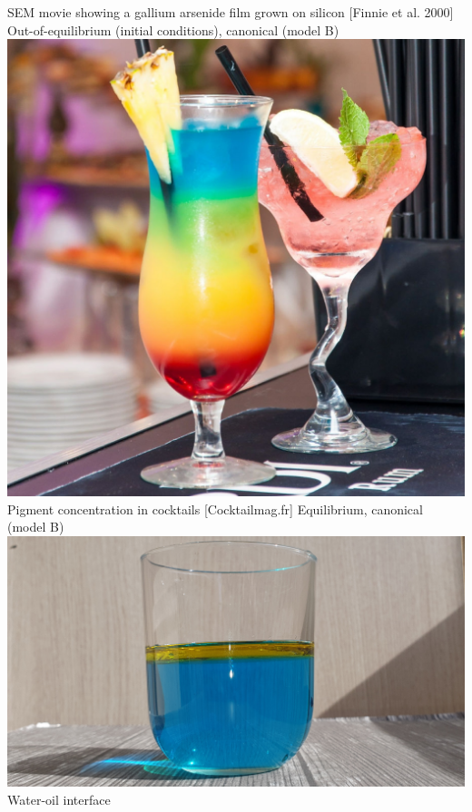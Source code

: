 \documentclass[9pt, dvipsnames]{beamer} %
\begin{document}
\begin{frame}
\begin{overprint}
		    SEM movie showing a gallium arsenide film grown on silicon [Finnie et al. 2000]
	    \onslide<4>
	        Out-of-equilibrium (initial conditions), canonical (model B) \\
	        \centering
		    \includegraphics[scale=0.15]{binary-fluid.jpeg} \\
		    Pigment concentration in cocktails [Cocktailmag.fr] 	    
            Equilibrium, canonical (model B) \\
            \centering
            \includegraphics[scale=0.1]{eau-huile.jpg} \\
            Water-oil interface 
	\end{overprint}
\end{frame}
\end{document}
